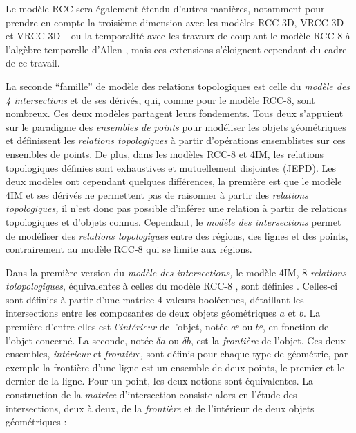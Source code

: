 Le modèle RCC sera également étendu d'autres manières, notamment pour
prendre en compte la troisième dimension avec les modèles RCC-3D,
VRCC-3D et VRCC-3D+ ou la temporalité avec les travaux de
\textcite{XXX} couplant le modèle RCC-8 à l'algèbre temporelle d'Allen
\autocite{Sabharwal2011}, mais ces extensions s'éloignent cependant du
cadre de ce travail.

La seconde \enquote{famille} de modèle des relations topologiques est
celle du \emph{modèle des 4 intersections}
\autocite[4IM,][]{Egenhofer1989} et de ses dérivés, qui, comme pour le
modèle RCC-8, sont nombreux. Ces deux modèles partagent leurs
fondements. Tous deux s’appuient sur le paradigme des \emph{ensembles
  de points} pour modéliser les objets géométriques et définissent les
\emph{relations topologiques} à partir d'opérations ensemblistes sur
ces ensembles de points. De plus, dans les modèles RCC-8
\autocite{Randell1992} et 4IM, les relations topologiques définies
sont exhaustives et mutuellement disjointes (JEPD). Les deux modèles
ont cependant quelques différences, la première est que le modèle 4IM
et ses dérivés ne permettent pas de raisonner à partir des
\emph{relations topologiques,} il n'est donc pas possible d'inférer
une relation à partir de relations topologiques et d'objets
connus. Cependant, le \emph{modèle des intersections} permet de
modéliser des \emph{relations topologiques} entre des régions, des
lignes et des points, contrairement au modèle RCC-8 qui se limite aux
régions.

Dans la première version du \emph{modèle des intersections,} le modèle
4IM, 8 \emph{relations tolopologiques}, équivalentes à celles du
modèle RCC-8 \autocite{Duchene2019}, sont définies
\textcite{Egenhofer1989,Egenhofer1990,Egenhofer1991a}. Celles-ci sont
définies à partir d'une matrice 4 valeurs booléennes, détaillant les
intersections entre les composantes de deux objets géométriques \(a\)
et \(b\). La première d'entre elles est \emph{l'intérieur} de l'objet,
notée \(aᵒ\) ou \(bᵒ\), en fonction de l'objet concerné. La seconde,
notée \(δa\) ou \(δb\), est la \emph{frontière} de l'objet. Ces deux
ensembles, \emph{intérieur} et \emph{frontière,} sont définis pour
chaque type de géométrie, par exemple la frontière d'une ligne est un
ensemble de deux points, le premier et le dernier de la ligne. Pour un
point, les deux notions sont équivalentes. La construction de la
\emph{matrice }d'intersection consiste alors en l'étude des
intersections, deux à deux, de la \emph{frontière} et de l'intérieur
de deux objets géométriques :

